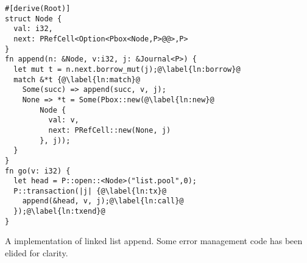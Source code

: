 \begin{lstfloat}
  \begin{lstlisting}[escapechar=\@]
#[derive(Root)]
struct Node {
  val: i32,
  next: PRefCell<Option<Pbox<Node,P>@@>,P>
}
fn append(n: &Node, v:i32, j: &Journal<P>) {
  let mut t = n.next.borrow_mut(j);@\label{ln:borrow}@
  match &*t {@\label{ln:match}@
    Some(succ) => append(succ, v, j);
    None => *t = Some(Pbox::new(@\label{ln:new}@
        Node {
          val: v,
          next: PRefCell::new(None, j)
        }, j));
  }
}
fn go(v: i32) {
  let head = P::open::<Node>("list.pool",0);
  P::transaction(|j| {@\label{ln:tx}@
    append(&head, v, j);@\label{ln:call}@
  });@\label{ln:txend}@
}
\end{lstlisting}
\caption{A \this{} implementation of linked list append.  Some error management code has been elided for clarity.}
\label{lst:example}
\end{lstfloat}

